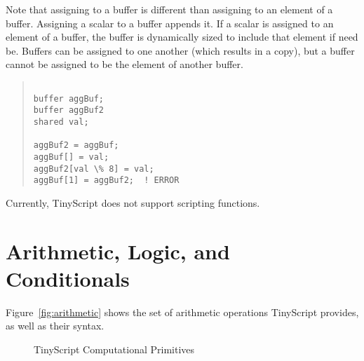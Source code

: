 \documentclass[12pt]{article}
\begin{document}
Note that assigning to a buffer is different than assigning to an
element of a buffer. Assigning a scalar to a buffer appends it. If a
scalar is assigned to an element of a buffer, the buffer is
dynamically sized to include that element if need be. Buffers can be
assigned to one another (which results in a copy), but a buffer cannot
be assigned to be the element of another buffer.

\begin{quotation}
\begin{verbatim}

buffer aggBuf;
buffer aggBuf2
shared val;

aggBuf2 = aggBuf;
aggBuf[] = val;
aggBuf2[val \% 8] = val;
aggBuf[1] = aggBuf2;  ! ERROR
\end{verbatim}
\end{quotation}

Currently, TinyScript does not support scripting functions.

\section{Arithmetic, Logic, and Conditionals}

Figure~\ref{fig:arithmetic} shows the set of arithmetic operations
TinyScript provides, as well as their syntax.

\begin{figure}
\centering
{}
\caption{TinyScript Computational Primitives}
\label{fig:tscriptcomp}
\end{figure}
\end{document}

